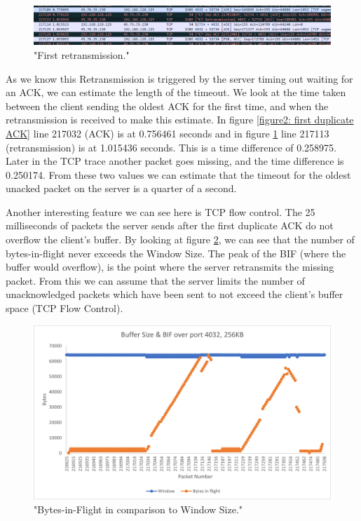 \documentclass[12pt]{article}
\begin{document}
\begin{figure}[!htbp]
  \centering
  \includegraphics[width=\linewidth]{4032-256KB-retransmission.PNG}
  \caption{"First retransmission."}
  \label{figure4: First retransmission}
\end{figure}

As we know this Retransmission is triggered by the server timing out waiting for an ACK, we can estimate the length of the timeout.
We look at the time taken between the client sending the oldest ACK for the first time, and when the retransmission is received to make this estimate.
In figure \ref{figure2: first duplicate ACK} line 217032 (ACK) is at 0.756461 seconds and in figure \ref{figure4: First retransmission} line 217113 (retransmission) is at 1.015436 seconds.
This is a time difference of 0.258975.
Later in the TCP trace another packet goes missing, and the time difference is 0.250174.
From these two values we can estimate that the timeout for the oldest unacked packet on the server is a quarter of a second.

Another interesting feature we can see here is TCP flow control.
The 25 milliseconds of packets the server sends after the first duplicate ACK do not overflow the client's buffer.
By looking at figure \ref{figure3: BIF and Window Size}, we can see that the number of bytes-in-flight never exceeds the Window Size.
The peak of the BIF (where the buffer would overflow), is the point where the server retransmits the missing packet.
From this we can assume that the server limits the number of unacknowledged packets which have been sent to not exceed the client's buffer space (TCP Flow Control).

\begin{figure}[!htbp]
  \centering
  \includegraphics[width=\linewidth]{4032-256KB-bytes-in-flight.png}
  \caption{"Bytes-in-Flight in comparison to Window Size."}
  \label{figure3: BIF and Window Size}
\end{figure}
\end{document}
